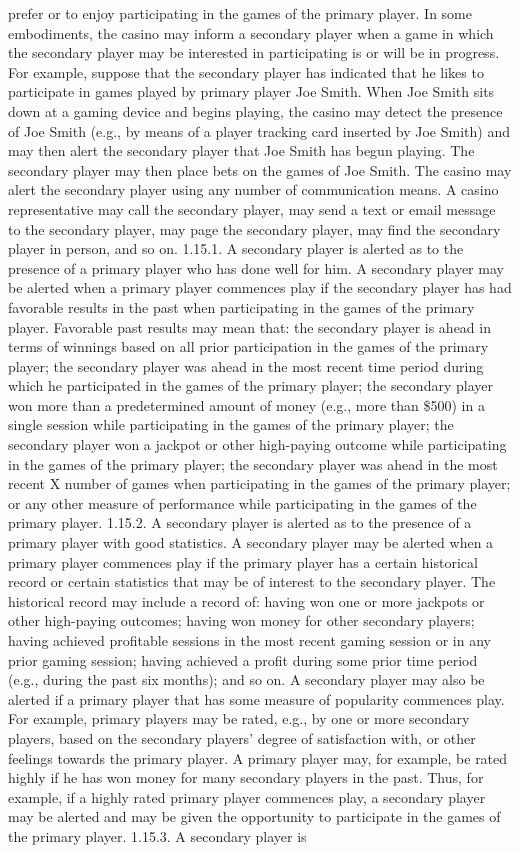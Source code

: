 \documentclass[11pt,a4paper]{article}
\begin{document}
prefer or to enjoy participating in the games of the primary player. In some embodiments, the casino may inform a secondary player when a game in which the secondary player may be interested in participating is or will be in progress. For example, suppose that the secondary player has indicated that he likes to participate in games played by primary player Joe Smith. When Joe Smith sits down at a gaming device and begins playing, the casino may detect the presence of Joe Smith (e.g., by means of a player tracking card inserted by Joe Smith) and may then alert the secondary player that Joe Smith has begun playing. The secondary player may then place bets on the games of Joe Smith. The casino may alert the secondary player using any number of communication means. A casino representative may call the secondary player, may send a text or email message to the secondary player, may page the secondary player, may find the secondary player in person, and so on. 1.15.1. A secondary player is alerted as to the presence of a primary player who has done well for him. A secondary player may be alerted when a primary player commences play if the secondary player has had favorable results in the past when participating in the games of the primary player. Favorable past results may mean that: the secondary player is ahead in terms of winnings based on all prior participation in the games of the primary player; the secondary player was ahead in the most recent time period during which he participated in the games of the primary player; the secondary player won more than a predetermined amount of money (e.g., more than \$500) in a single session while participating in the games of the primary player; the secondary player won a jackpot or other high-paying outcome while participating in the games of the primary player; the secondary player was ahead in the most recent X number of games when participating in the games of the primary player; or any other measure of performance while participating in the games of the primary player. 1.15.2. A secondary player is alerted as to the presence of a primary player with good statistics. A secondary player may be alerted when a primary player commences play if the primary player has a certain historical record or certain statistics that may be of interest to the secondary player. The historical record may include a record of: having won one or more jackpots or other high-paying outcomes; having won money for other secondary players; having achieved profitable sessions in the most recent gaming session or in any prior gaming session; having achieved a profit during some prior time period (e.g., during the past six months); and so on. A secondary player may also be alerted if a primary player that has some measure of popularity commences play. For example, primary players may be rated, e.g., by one or more secondary players, based on the secondary players' degree of satisfaction with, or other feelings towards the primary player. A primary player may, for example, be rated highly if he has won money for many secondary players in the past. Thus, for example, if a highly rated primary player commences play, a secondary player may be alerted and may be given the opportunity to participate in the games of the primary player. 1.15.3. A secondary player is 
\end{document}
